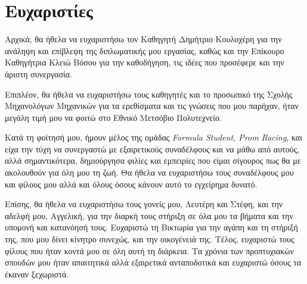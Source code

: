 \section*{Ευχαριστίες}

\noindent
Αρχικά, θα ήθελα να ευχαριστήσω τον Καθηγητή Δημήτριο Κουλοχέρη για την ανάληψη και επίβλεψη της διπλωματικής μου εργασίας, καθώς και την Επίκουρο Καθηγήτρια Κλειώ Βόσου για την καθοδήγηση, τις ιδέες που προσέφερε και την άριστη συνεργασία.

\noindent
Επιπλέον, θα ήθελα να ευχαριστήσω τους καθηγητές και το προσωπικό της Σχολής Μηχανολόγων Μηχανικών για τα ερεθίσματα και τις γνώσεις που μου παρήχαν, ήταν μεγάλη τιμή μου να φοιτώ στο Εθνικό Μετσόβιο Πολυτεχνείο. 

\noindent
Κατά τη φοίτησή μου, ήμουν μέλος της ομάδας \textit{Formula Student, Prom Racing}, και είχα την τύχη να συνεργαστώ με εξαιρετικούς συναδέλφους και να μάθω από αυτούς, αλλά σημαντικότερα, δημιούργησα φιλίες και εμπειρίες που είμαι σίγουρος πως θα με ακολουθούν για όλη μου τη ζωή. Θα ήθελα να ευχαριστήσω τους συναδέλφους μου και φίλους μου αλλά και όλους όσους κάνουν αυτό το εγχείρημα δυνατό.

\noindent
Επίσης, θα ήθελα να ευχαριστήσω τους γονείς μου, Λευτέρη και Στέφη, και την αδελφή μου, Αγγελική, για την διαρκή τους στήριξη σε όλα μου τα βήματα και την υπομονή και κατανόησή τους. Ευχαριστώ τη Βικτωρία για την αγάπη και τη στήριξή της, που μου δίνει κίνητρο συνεχώς, και την οικογένειά της. Τέλος, ευχαριστώ τους φίλους που ήταν κοντά μου σε όλη αυτή τη διάρκεια. Τα χρόνια των προπτυχιακών σπουδών μου ήταν απαιτητικά αλλά εξαιρετικά ανταποδοτικά και ευχαριστώ όσους τα έκαναν ξεχωριστά.